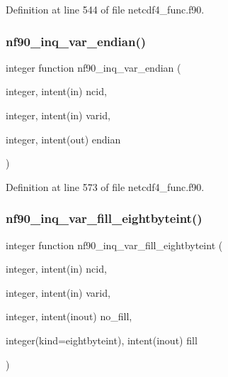 Definition at line 544 of file netcdf4\+\_\+func.\+f90.

\mbox{\label{netcdf4__func_8f90_a0031d4f4ca98a518426a5347fa429c6f}} 
\subsubsection{\texorpdfstring{nf90\+\_\+inq\+\_\+var\+\_\+endian()}{nf90\_inq\_var\_endian()}}
{\footnotesize\ttfamily integer function nf90\+\_\+inq\+\_\+var\+\_\+endian (\begin{DoxyParamCaption}\item[{integer, intent(in)}]{ncid,  }\item[{integer, intent(in)}]{varid,  }\item[{integer, intent(out)}]{endian }\end{DoxyParamCaption})}



Definition at line 573 of file netcdf4\+\_\+func.\+f90.

\mbox{\label{netcdf4__func_8f90_af257754d3706216ec0edcd01e65435a9}} 
\subsubsection{\texorpdfstring{nf90\+\_\+inq\+\_\+var\+\_\+fill\+\_\+eightbyteint()}{nf90\_inq\_var\_fill\_eightbyteint()}}
{\footnotesize\ttfamily integer function nf90\+\_\+inq\+\_\+var\+\_\+fill\+\_\+eightbyteint (\begin{DoxyParamCaption}\item[{integer, intent(in)}]{ncid,  }\item[{integer, intent(in)}]{varid,  }\item[{integer, intent(inout)}]{no\+\_\+fill,  }\item[{integer(kind=eightbyteint), intent(inout)}]{fill }\end{DoxyParamCaption})}



